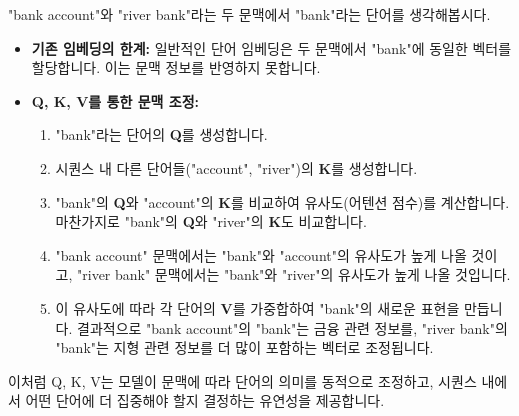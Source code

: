 \documentclass[11pt,a4paper]{article}
\begin{document}
\begin{examplebox}[title={Q, K, V 예시: 문맥에 따른 단어 의미 조정}]
"bank account"와 "river bank"라는 두 문맥에서 "bank"라는 단어를 생각해봅시다.
\begin{itemize}
    \item \textbf{기존 임베딩의 한계:} 일반적인 단어 임베딩은 두 문맥에서 "bank"에 동일한 벡터를 할당합니다. 이는 문맥 정보를 반영하지 못합니다.
    \item \textbf{Q, K, V를 통한 문맥 조정:}
    \begin{enumerate}
        \item "bank"라는 단어의 \textbf{Q}를 생성합니다.
        \item 시퀀스 내 다른 단어들("account", "river")의 \textbf{K}를 생성합니다.
        \item "bank"의 \textbf{Q}와 "account"의 \textbf{K}를 비교하여 유사도(어텐션 점수)를 계산합니다. 마찬가지로 "bank"의 \textbf{Q}와 "river"의 \textbf{K}도 비교합니다.
        \item "bank account" 문맥에서는 "bank"와 "account"의 유사도가 높게 나올 것이고, "river bank" 문맥에서는 "bank"와 "river"의 유사도가 높게 나올 것입니다.
        \item 이 유사도에 따라 각 단어의 \textbf{V}를 가중합하여 "bank"의 새로운 표현을 만듭니다. 결과적으로 "bank account"의 "bank"는 금융 관련 정보를, "river bank"의 "bank"는 지형 관련 정보를 더 많이 포함하는 벡터로 조정됩니다.
    \end{enumerate}
\end{itemize}
이처럼 Q, K, V는 모델이 문맥에 따라 단어의 의미를 동적으로 조정하고, 시퀀스 내에서 어떤 단어에 더 집중해야 할지 결정하는 유연성을 제공합니다.
\end{examplebox}
\end{document}
